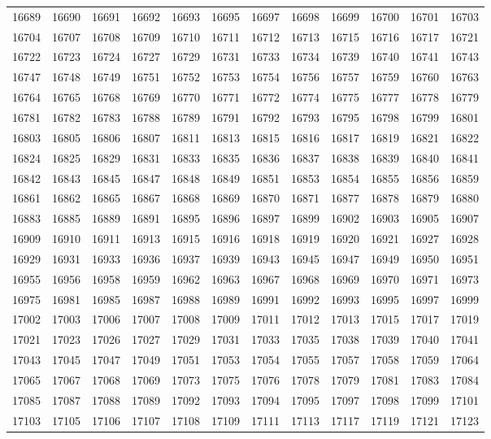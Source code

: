 \begin{center}
\begin{longtable}{llllllllllll}
16689 &16690 &16691 &16692 &16693 &16695 &16697 &16698 &16699 &16700 &16701 &16703 \\
16704 &16707 &16708 &16709 &16710 &16711 &16712 &16713 &16715 &16716 &16717 &16721 \\
16722 &16723 &16724 &16727 &16729 &16731 &16733 &16734 &16739 &16740 &16741 &16743 \\
16747 &16748 &16749 &16751 &16752 &16753 &16754 &16756 &16757 &16759 &16760 &16763 \\
16764 &16765 &16768 &16769 &16770 &16771 &16772 &16774 &16775 &16777 &16778 &16779 \\
16781 &16782 &16783 &16788 &16789 &16791 &16792 &16793 &16795 &16798 &16799 &16801 \\
16803 &16805 &16806 &16807 &16811 &16813 &16815 &16816 &16817 &16819 &16821 &16822 \\
16824 &16825 &16829 &16831 &16833 &16835 &16836 &16837 &16838 &16839 &16840 &16841 \\
16842 &16843 &16845 &16847 &16848 &16849 &16851 &16853 &16854 &16855 &16856 &16859 \\
16861 &16862 &16865 &16867 &16868 &16869 &16870 &16871 &16877 &16878 &16879 &16880 \\
16883 &16885 &16889 &16891 &16895 &16896 &16897 &16899 &16902 &16903 &16905 &16907 \\
16909 &16910 &16911 &16913 &16915 &16916 &16918 &16919 &16920 &16921 &16927 &16928 \\
16929 &16931 &16933 &16936 &16937 &16939 &16943 &16945 &16947 &16949 &16950 &16951 \\
16955 &16956 &16958 &16959 &16962 &16963 &16967 &16968 &16969 &16970 &16971 &16973 \\
16975 &16981 &16985 &16987 &16988 &16989 &16991 &16992 &16993 &16995 &16997 &16999 \\
17002 &17003 &17006 &17007 &17008 &17009 &17011 &17012 &17013 &17015 &17017 &17019 \\
17021 &17023 &17026 &17027 &17029 &17031 &17033 &17035 &17038 &17039 &17040 &17041 \\
17043 &17045 &17047 &17049 &17051 &17053 &17054 &17055 &17057 &17058 &17059 &17064 \\
17065 &17067 &17068 &17069 &17073 &17075 &17076 &17078 &17079 &17081 &17083 &17084 \\
17085 &17087 &17088 &17089 &17092 &17093 &17094 &17095 &17097 &17098 &17099 &17101 \\
17103 &17105 &17106 &17107 &17108 &17109 &17111 &17113 &17117 &17119 &17121 &17123 \\

\end{longtable}
\end{center}
